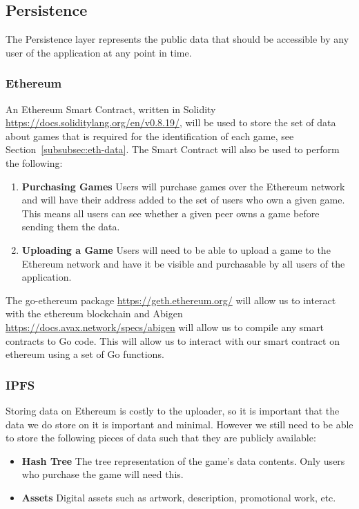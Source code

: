 
\subsection{Persistence}

The Persistence layer represents the public data that should be accessible by any user of the application at any point in time. 

\subsubsection*{Ethereum}

An Ethereum Smart Contract, written in Solidity \url{https://docs.soliditylang.org/en/v0.8.19/}, will be used to store the set of data about games that is required for the identification of each game, see Section~\ref{subsubsec:eth-data}. The Smart Contract will also be used to perform the following:

\begin{enumerate}
  \item \textbf{Purchasing Games} Users will purchase games over the Ethereum network and will have their address added to the set of users who own a given game. This means all users can see whether a given peer owns a game before sending them the data.
  \item \textbf{Uploading a Game} Users will need to be able to upload a game to the Ethereum network and have it be visible and purchasable by all users of the application.
\end{enumerate}

\vspace{2mm}\noindent
The go-ethereum package \url{https://geth.ethereum.org/} will allow us to interact with the ethereum blockchain and Abigen \url{https://docs.avax.network/specs/abigen} will allow us to compile any smart contracts to Go code. This will allow us to interact with our smart contract on ethereum using a set of Go functions.

\subsubsection*{IPFS}

Storing data on Ethereum is costly to the uploader, so it is important that the data we do store on it is important and minimal. However we still need to be able to store the following pieces of data such that they are publicly available:

\begin{itemize}
  \item \textbf{Hash Tree} The tree representation of the game's data contents. Only users who purchase the game will need this.
  \item \textbf{Assets} Digital assets such as artwork, description, promotional work, etc.  
\end{itemize}


